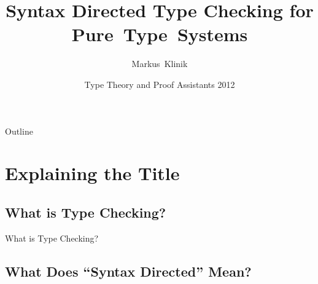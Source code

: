 \documentclass{beamer}
\title
{Syntax Directed Type Checking for Pure~Type~Systems}
\author
{Markus~Klinik}
\institute[Radboud University Nijmegen] %
{
  Radboud University Nijmegen
}
\date
{Type Theory and Proof Assistants 2012}
\begin{document}
\begin{frame}
  \titlepage
\end{frame}

\begin{frame}{Outline}
  \tableofcontents
\end{frame}





\section{Explaining the Title}

\subsection{What is Type Checking?}


\begin{frame}{What is Type Checking?}


\end{frame}


\subsection{What Does ``Syntax Directed'' Mean?}
\end{document}
